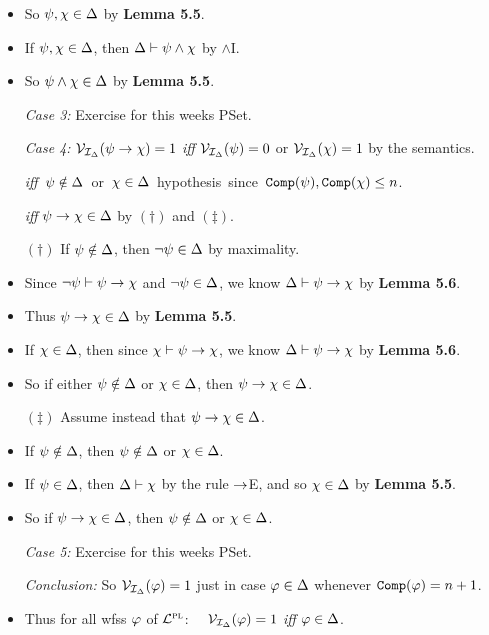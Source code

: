 \documentclass[a4paper, 11pt]{article} %
\begin{document}
\begin{itemize}
      \item So $\psi,\chi\in\Delta$ by \textbf{Lemma 5.5}.
      \item If $\psi,\chi\in\Delta$, then $\Delta \vdash \psi \wedge \chi$ by $\wedge$I. 
      \item So $\psi \wedge \chi \in \Delta$ by \textbf{Lemma 5.5}.
    \item[\it Case 3:] Exercise for this weeks PSet.
    \item[\it Case 4:] $\mathcal{V}_{\mathcal{I}_\Delta}(\psi \rightarrow \chi)=1$ \textit{iff} $\mathcal{V}_{\mathcal{I}_\Delta}(\psi) = 0$ or $\mathcal{V}_{\mathcal{I}_\Delta}(\chi) = 1$ by the semantics.
      \item[] \hspace{1.1in} \mbox{\textit{iff} $\psi\notin\Delta$ or $\chi \in \Delta$ hypothesis since $\texttt{Comp}(\psi), \texttt{Comp}(\chi) \leq n$.}
      \item[] \hspace{1.1in} \textit{iff} $\psi\rightarrow\chi\in\Delta$ by $(\dagger)$ and $(\ddagger)$.
      \item[$(\dagger)$] If $\psi\notin\Delta$, then $\neg\psi\in\Delta$ by maximality.
      \item Since $\neg \psi \vdash \psi \rightarrow \chi$ and $\neg \psi \in \Delta$, we know $\Delta\vdash\psi\rightarrow\chi$ by \textbf{Lemma 5.6}.
      \item Thus $\psi\rightarrow\chi\in\Delta$ by \textbf{Lemma 5.5}.
      \item If $\chi\in\Delta$, then since $\chi\vdash\psi\rightarrow\chi$, we know $\Delta\vdash\psi\rightarrow\chi$ by \textbf{Lemma 5.6}.
      \item So if either $\psi\notin\Delta$ or $\chi\in\Delta$, then $\psi\rightarrow\chi\in\Delta$. 
      \item[$(\ddagger)$] Assume instead that $\psi\rightarrow\chi\in\Delta$.
      \item If $\psi\notin\Delta$, then $\psi\notin\Delta$ or $\chi\in\Delta$.
      \item If $\psi\in\Delta$, then $\Delta\vdash\chi$ by the rule $\rightarrow$E, and so $\chi\in\Delta$ by \textbf{Lemma 5.5}.
      \item So if $\psi\rightarrow\chi\in\Delta$, then $\psi\notin\Delta$ or $\chi\in\Delta$.  
    \item[\it Case 5:] Exercise for this weeks PSet.
    \item[\it Conclusion:] So $\mathcal{V}_{\mathcal{I}_\Delta}(\varphi)=1$ just in case $\varphi\in\Delta$ whenever $\texttt{Comp}(\varphi) = n + 1$.
      \item Thus for all wfss $\varphi$ of $\mathcal{L}^{\textsc{pl}}$:~~ $\mathcal{V}_{\mathcal{I}_{\Delta}}(\varphi) = 1$ \textit{iff} $\varphi\in\Delta$.
\end{itemize}
  
\end{document}
